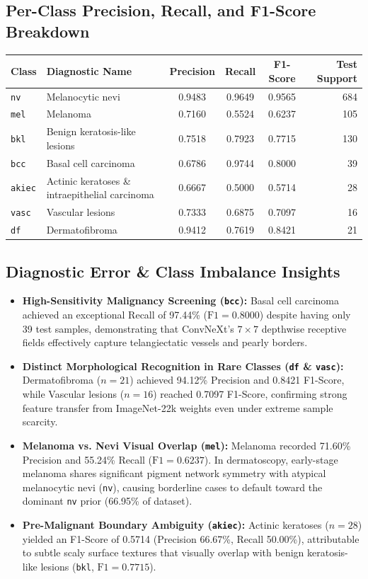 \documentclass[12pt,a4paper]{article}
\begin{document}
\subsection{Per-Class Precision, Recall, and F1-Score Breakdown}
\begin{table}[h!]
\centering
\renewcommand{\arraystretch}{1.2}
\begin{tabularx}{\textwidth}{l X c c c r}
\toprule
\textbf{Class} & \textbf{Diagnostic Name} & \textbf{Precision} & \textbf{Recall} & \textbf{F1-Score} & \textbf{Test Support} \\
\midrule
\texttt{nv} & Melanocytic nevi & 0.9483 & 0.9649 & 0.9565 & 684 \\
\texttt{mel} & Melanoma & 0.7160 & 0.5524 & 0.6237 & 105 \\
\texttt{bkl} & Benign keratosis-like lesions & 0.7518 & 0.7923 & 0.7715 & 130 \\
\texttt{bcc} & Basal cell carcinoma & 0.6786 & 0.9744 & 0.8000 & 39 \\
\texttt{akiec} & Actinic keratoses \& intraepithelial carcinoma & 0.6667 & 0.5000 & 0.5714 & 28 \\
\texttt{vasc} & Vascular lesions & 0.7333 & 0.6875 & 0.7097 & 16 \\
\texttt{df} & Dermatofibroma & 0.9412 & 0.7619 & 0.8421 & 21 \\
\bottomrule
\end{tabularx}
\end{table}

\subsection{Diagnostic Error \& Class Imbalance Insights}
\begin{itemize}[leftmargin=*]
    \item \textbf{High-Sensitivity Malignancy Screening (\texttt{bcc}):} Basal cell carcinoma achieved an exceptional Recall of 97.44\% ($\text{F1} = 0.8000$) despite having only 39 test samples, demonstrating that ConvNeXt's $7\times 7$ depthwise receptive fields effectively capture telangiectatic vessels and pearly borders.
    \item \textbf{Distinct Morphological Recognition in Rare Classes (\texttt{df} \& \texttt{vasc}):} Dermatofibroma ($n = 21$) achieved 94.12\% Precision and 0.8421 F1-Score, while Vascular lesions ($n = 16$) reached 0.7097 F1-Score, confirming strong feature transfer from ImageNet-22k weights even under extreme sample scarcity.
    \item \textbf{Melanoma vs. Nevi Visual Overlap (\texttt{mel}):} Melanoma recorded 71.60\% Precision and 55.24\% Recall ($\text{F1} = 0.6237$). In dermatoscopy, early-stage melanoma shares significant pigment network symmetry with atypical melanocytic nevi (\texttt{nv}), causing borderline cases to default toward the dominant \texttt{nv} prior (66.95\% of dataset).
    \item \textbf{Pre-Malignant Boundary Ambiguity (\texttt{akiec}):} Actinic keratoses ($n = 28$) yielded an F1-Score of 0.5714 (Precision 66.67\%, Recall 50.00\%), attributable to subtle scaly surface textures that visually overlap with benign keratosis-like lesions (\texttt{bkl}, $\text{F1} = 0.7715$).
\end{itemize}
\end{document}
